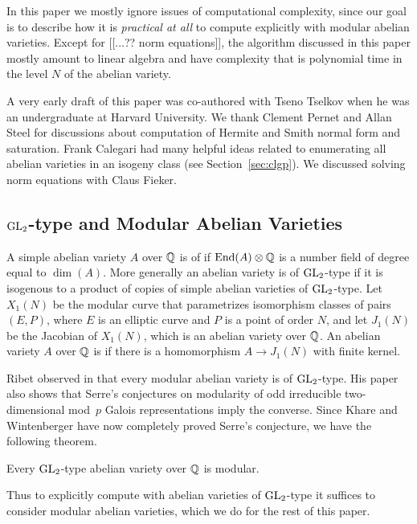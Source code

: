 \documentclass{article}
\begin{document}
In this paper we mostly ignore issues of computational complexity,
since our goal is to describe how it is {\em practical at all} to
compute explicitly with modular abelian varieties.  Except for [[...??
				norm equations]], the algorithm discussed in this paper mostly amount
to linear algebra and have complexity that is polynomial time in the
level $N$ of the abelian variety.


\vspace{2em}
 A very early draft of this paper was
co-authored with Tseno Tselkov when he was an undergraduate at Harvard
University.  We thank Clement Pernet and Allan Steel for discussions
about computation of Hermite and Smith normal form and saturation.
Frank Calegari had many helpful ideas related to enumerating all
abelian varieties in an isogeny class (see Section~\ref{sec:clgp}).
We discussed solving norm equations with Claus Fieker.

\subsection{$\operatorname{GL}_2$-type and Modular Abelian Varieties}
A simple abelian variety $A$ over $\mathbb{Q}$ is of  if
$\operatorname{End}(A)\otimes\mathbb{Q}$ is a number field of degree equal to $\dim(A)$.
More generally an abelian variety is of $\operatorname{GL}_2$-type if it is
isogenous to a product of copies of simple abelian varieties of
$\operatorname{GL}_2$-type.  Let $X_1(N)$ be the modular curve that parametrizes
isomorphism classes of pairs $(E,P)$, where $E$ is an elliptic curve
and $P$ is a point of order $N$, and let $J_1(N)$ be the Jacobian of
$X_1(N)$, which is an abelian variety over $\mathbb{Q}$.  An abelian variety
$A$ over $\mathbb{Q}$ is  if there is a homomorphism $A \to
	J_1(N)$ with finite kernel.

Ribet observed in \cite[\S3]{ribet:abvars} that every modular abelian
variety is of $\operatorname{GL}_2$-type.  His paper also shows
\cite[Thm.~4.4]{ribet:abvars} that Serre's conjectures
\cite{serre:conjectures} on modularity of odd irreducible
two-dimensional mod~$p$ Galois representations imply the converse.
Since Khare and Wintenberger have now completely proved Serre's
conjecture, we have the following theorem.

\begin{theorem}\label{conj:ribmod}
	Every $\operatorname{GL}_2$-type abelian variety over $\mathbb{Q}$ is modular.
\end{theorem}
Thus to explicitly compute with abelian varieties of $\operatorname{GL}_2$-type it
suffices to consider modular abelian varieties, which we do for the
rest of this paper.
\end{document}
